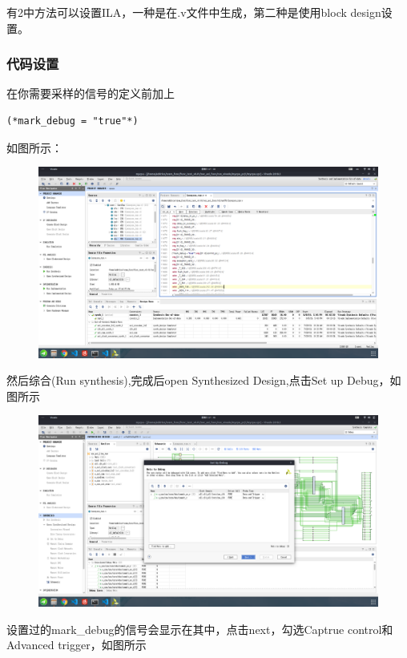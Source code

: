 \documentclass[lang=cn,11pt,a4paper]{elegantpaper}
\begin{document}
有2中方法可以设置ILA，一种是在.v文件中生成，第二种是使用block design设置。
\subsubsection{代码设置}

在你需要采样的信号的定义前加上 
\begin{lstlisting}
(*mark_debug = "true"*)
\end{lstlisting}
如图所示：
\begin{figure}[H]
\centering
\includegraphics[width=\linewidth]{image/mark_debug_1.png}
\end{figure}

然后综合(Run synthesis),完成后open Synthesized Design,点击Set up Debug，如图所示
\begin{figure}[H]
\centering
\includegraphics[width=\linewidth]{image/mark_debug_2.png}
\end{figure}
设置过的mark\_debug的信号会显示在其中，点击next，勾选Captrue control和Advanced trigger，如图所示
\end{document}
